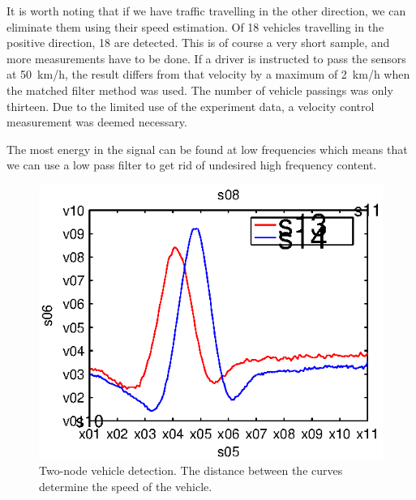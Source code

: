 It is worth noting that if we have traffic travelling in the other direction, we can eliminate them using their speed estimation. Of 18 vehicles travelling in the positive direction, 18 are detected. This is of course a very short sample, and more measurements have to be done. If a driver is instructed to pass the sensors at 50~km/h, the result differs from that velocity by a maximum of 2~km/h when the matched filter method was used. The number of vehicle passings was only thirteen. Due to the limited use of the experiment data, a velocity control measurement was deemed necessary.

The most energy in the signal can be found at low frequencies which means that we can use a low pass filter to get rid of undesired high frequency content.

\begin{subfigures}
\begin{figure}[!ht]
  \centering
  	\begin{minipage}{0.45\linewidth}
  \centering
  
   \includegraphics[width=\linewidth]{images/vehicledet}
  \caption[Two-node vehicle detection]{Two-node vehicle detection. The distance between the curves determine the speed of the vehicle.}
  \label{fig:vehicledet}
  \end{minipage}\hfill
  \begin{minipage}{0.45\linewidth}
   \centering
   

\end{minipage}
\end{figure}
\end{subfigures}
